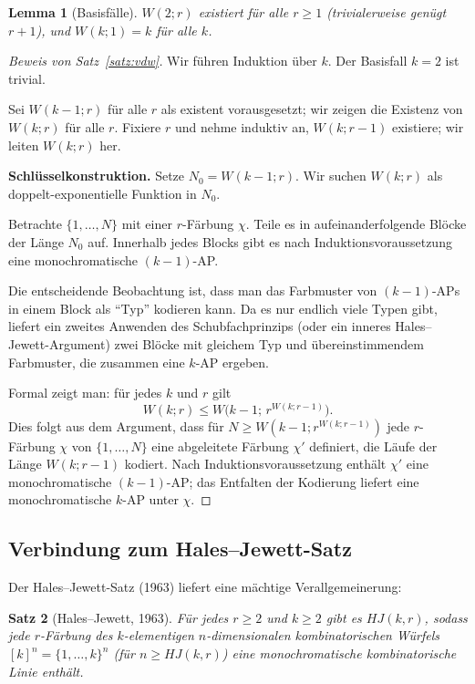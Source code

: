 \documentclass[12pt,a4paper]{amsart}
\newtheorem{theorem}{Satz}[section]
\newtheorem{lemma}[theorem]{Lemma}
\theoremstyle{definition}
\begin{document}
\begin{lemma}[Basisfälle]
$W(2; r)$ existiert für alle $r \geq 1$ (trivialerweise genügt $r+1$), und
$W(k; 1) = k$ für alle $k$.
\end{lemma}

\begin{proof}[Beweis von Satz~\ref{satz:vdw}]
Wir führen Induktion über $k$. Der Basisfall $k=2$ ist trivial.

Sei $W(k-1; r)$ für alle $r$ als existent vorausgesetzt; wir zeigen die Existenz
von $W(k; r)$ für alle $r$.
Fixiere $r$ und nehme induktiv an, $W(k; r-1)$ existiere; wir leiten $W(k; r)$ her.

\medskip
\noindent\textbf{Schlüsselkonstruktion.}
Setze $N_0 = W(k-1; r)$. Wir suchen $W(k; r)$ als doppelt-exponentielle Funktion in $N_0$.

Betrachte $\{1, \ldots, N\}$ mit einer $r$-Färbung $\chi$. Teile es in aufeinanderfolgende
Blöcke der Länge $N_0$ auf. Innerhalb jedes Blocks gibt es nach Induktionsvoraussetzung
eine monochromatische $(k-1)$-AP.

Die entscheidende Beobachtung ist, dass man das Farbmuster von $(k-1)$-APs in einem
Block als ``Typ'' kodieren kann. Da es nur endlich viele Typen gibt, liefert ein
zweites Anwenden des Schubfachprinzips (oder ein inneres Hales--Jewett-Argument)
zwei Blöcke mit gleichem Typ und übereinstimmendem Farbmuster, die zusammen eine
$k$-AP ergeben.

\medskip
Formal zeigt man: für jedes $k$ und $r$ gilt
\[
  W(k; r) \leq W\bigl(k-1;\, r^{W(k;r-1)}\bigr).
\]
Dies folgt aus dem Argument, dass für $N \geq W(k-1; r^{W(k;r-1)})$ jede $r$-Färbung
$\chi$ von $\{1,\ldots,N\}$ eine abgeleitete Färbung $\chi'$ definiert, die Läufe
der Länge $W(k;r-1)$ kodiert. Nach Induktionsvoraussetzung enthält $\chi'$ eine
monochromatische $(k-1)$-AP; das Entfalten der Kodierung liefert eine monochromatische
$k$-AP unter $\chi$.
\end{proof}

\subsection{Verbindung zum Hales--Jewett-Satz}

Der Hales--Jewett-Satz (1963) \cite{HalesJewett1963} liefert eine mächtige Verallgemeinerung:

\begin{theorem}[Hales--Jewett, 1963]\label{satz:hj}
Für jedes $r \geq 2$ und $k \geq 2$ gibt es $HJ(k,r)$, sodass jede $r$-Färbung des
$k$-elementigen $n$-dimensionalen kombinatorischen Würfels
$[k]^n = \{1,\ldots,k\}^n$ (für $n \geq HJ(k,r)$) eine monochromatische kombinatorische
Linie enthält.
\end{theorem}
\end{document}
